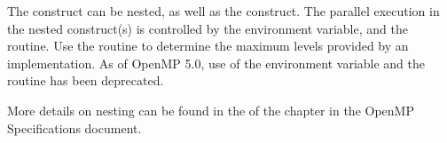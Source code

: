 The  construct can be nested, as well as the  construct.  
The parallel execution in the nested  construct(s) is controlled by the 
 environment variable, and the  routine. 
Use the  routine to determine the maximum levels provided by an implementation.
As of OpenMP 5.0, use of the  environment variable and the  routine 
has been deprecated.

More details on nesting can be found in the  of the  
chapter in the OpenMP Specifications document.


















